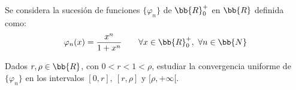 \begin{ejercicio}
    Se considera la sucesión de funciones $\{\varphi_n\}$ de $\bb{R}_0^+$ en $\bb{R}$ definida como:
    \begin{equation*}
        \varphi_n(x) = \frac{x^n}{1+x^n} \qquad \forall x\in \bb{R}_0^+,~\forall n\in \bb{N}
    \end{equation*}

    Dados $r,\rho\in \bb{R}$, con $0<r<1<\rho$, estudiar la convergencia uniforme de $\{\varphi_n\}$ en los intervalos $[0,r],~[r,\rho]$ y $[\rho,+\infty[$.\\
\end{ejercicio}